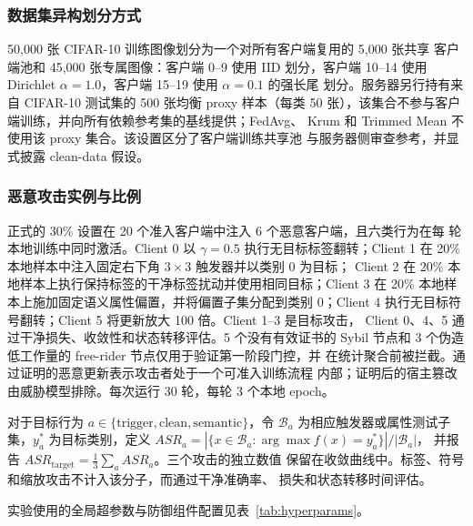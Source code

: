 \documentclass[11pt, a4paper, UTF8, fontset=fandol]{ctexart}
\begin{document}
\subsubsection{数据集异构划分方式}
50,000 张 CIFAR-10 训练图像划分为一个对所有客户端复用的 5,000 张共享
客户端池和 45,000 张专属图像：客户端 0--9 使用 IID 划分，客户端 10--14
使用 Dirichlet $\alpha=1.0$，客户端 15--19 使用 $\alpha=0.1$ 的强长尾
划分。服务器另行持有来自 CIFAR-10 测试集的 500 张均衡 proxy 样本（每类
50 张），该集合不参与客户端训练，并向所有依赖参考集的基线提供；FedAvg、
Krum 和 Trimmed Mean 不使用该 proxy 集合。该设置区分了客户端训练共享池
与服务器侧审查参考，并显式披露 clean-data 假设。

\subsubsection{恶意攻击实例与比例}
正式的 30\% 设置在 20 个准入客户端中注入 6 个恶意客户端，且六类行为在每
轮本地训练中同时激活。Client 0 以 $\gamma=0.5$ 执行无目标标签翻转；Client
1 在 20\% 本地样本中注入固定右下角 $3\times3$ 触发器并以类别 0 为目标；
Client 2 在 20\% 本地样本上执行保持标签的干净标签扰动并使用相同目标；Client
3 在 20\% 本地样本上施加固定语义属性偏置，并将偏置子集分配到类别 0；Client
4 执行无目标符号翻转；Client 5 将更新放大 100 倍。Client 1--3 是目标攻击，
Client 0、4、5 通过干净损失、收敛性和状态转移评估。5 个没有有效证书的
Sybil 节点和 3 个伪造低工作量的 free-rider 节点仅用于验证第一阶段门控，并
在统计聚合前被拦截。通过证明的恶意更新表示攻击者处于一个可准入训练流程
内部；证明后的宿主篡改由威胁模型排除。每次运行 30 轮，每轮 3 个本地 epoch。

对于目标行为 $a\in\{\mathrm{trigger},\mathrm{clean},\mathrm{semantic}\}$，令
$\mathcal{B}_a$ 为相应触发器或属性测试子集，$y_a^*$ 为目标类别，定义
$ASR_a=|\{x\in\mathcal{B}_a:\arg\max f(x)=y_a^*\}|/|\mathcal{B}_a|$，
并报告 $ASR_{\mathrm{target}}=\frac{1}{3}\sum_a ASR_a$。三个攻击的独立数值
保留在收敛曲线中。标签、符号和缩放攻击不计入该分子，而通过干净准确率、
损失和状态转移时间评估。

实验使用的全局超参数与防御组件配置见表~\ref{tab:hyperparams}。
\end{document}
